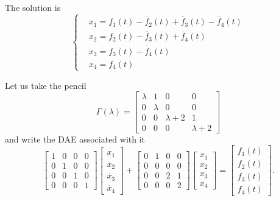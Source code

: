 \begin{example}
    The solution is
    \begin{equation*}
        \left\{
            \begin{aligned}
                & x_{1} = f_{1}(t) - \dot{f_{2}}(t) + \ddot{f_{3}}(t) - \dddot{f_{4}}(t) \\
                & x_{2} = f_{2}(t) - \dot{f_{3}}(t) + \ddot{f_{4}}(t) \\
                & x_{3} = f_{3}(t) - \dot{f_{4}}(t) \\
                & x_{4} = f_{4}(t)
            \end{aligned}
        \right.
    \end{equation*}
\end{example}
\pagebreak
\begin{example}
    Let us take the pencil
    \[
        \Gamma(\lambda) =
        \begin{bmatrix}
            \lambda & 1 & 0 & 0 \\
            0 & \lambda & 0 & 0 \\
            0 & 0 & \lambda + 2 & 1 \\
            0 & 0 & 0 & \lambda + 2
        \end{bmatrix}
    \]
    and write the DAE associated with it
    \[
        \begin{bmatrix}
            1 & 0 & 0 & 0 \\
            0 & 1 & 0 & 0 \\
            0 & 0 & 1 & 0 \\
            0 & 0 & 0 & 1
        \end{bmatrix}
        \begin{bmatrix}
            \dot{x_{1}} \\
            \dot{x_{2}} \\
            \dot{x_{3}} \\
            \dot{x_{4}}
        \end{bmatrix}
        + \begin{bmatrix}
            0 & 1 & 0 & 0 \\
            0 & 0 & 0 & 0 \\
            0 & 0 & 2 & 1 \\
            0 & 0 & 0 & 2
        \end{bmatrix}
        \begin{bmatrix}
            x_{1} \\
            x_{2} \\
            x_{3} \\
            x_{4}
        \end{bmatrix}
        = \begin{bmatrix}
            f_{1}(t) \\
            f_{2}(t) \\
            f_{3}(t) \\
            f_{4}(t)
        \end{bmatrix}.
    \]


\end{example}

